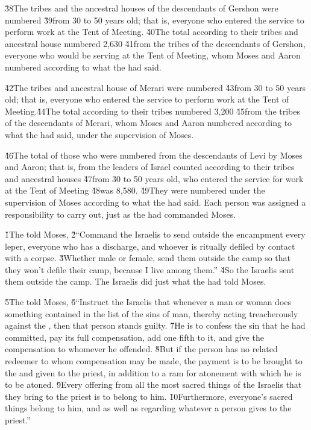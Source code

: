 \v{38}The tribes and the ancestral houses of the descendants of Gershon were numbered \v{39}from 30 to 50 years old; that is, everyone who entered the service to perform work at the Tent of Meeting. \v{40}The total according to their tribes and ancestral house numbered 2,630 \v{41}from the tribes of the descendants of Gershon, everyone who would be serving at the Tent of Meeting, whom Moses and Aaron numbered according to what the  had said.

\v{42}The tribes and ancestral house of Merari were numbered \v{43}from 30 to 50 years old; that is, everyone who entered the service to perform work at the Tent of Meeting.\v{44}The total according to their tribes numbered 3,200 \v{45}from the tribes of the descendants of Merari, whom Moses and Aaron numbered according to what the  had said, under the supervision of Moses.

\v{46}The total of those who were numbered from the descendants of Levi by Moses and Aaron; that is, from the leaders of Israel counted according to their tribes and ancestral houses \v{47}from 30 to 50 years old, who entered the service for work at the Tent of Meeting \v{48}was 8,580. \v{49}They were numbered under the supervision of Moses according to what the  had said. Each person was assigned a responsibility to carry out, just as the  had commanded Moses.

\v{1}The  told Moses, \v{2}``Command the Israelis to send outside the encampment every leper, everyone who has a discharge, and whoever is ritually defiled by contact with a corpse. \v{3}Whether male or female, send them outside the camp so that they won't defile their camp, because I live among them.'' \v{4}So the Israelis sent them outside the camp. The Israelis did just what the  had told Moses.

\v{5}The  told Moses, \v{6}``Instruct the Israelis that whenever a man or woman does something contained in the list of the sins of man, thereby acting treacherously against the , then that person stands guilty. \v{7}He is to confess the sin that he had committed, pay its full compensation, add one fifth to it, and give the compensation to whomever he offended. \v{8}But if the person has no related redeemer to whom compensation may be made, the payment is to be brought to the  and given to the priest, in addition to a ram for atonement with which he is to be atoned. \v{9}Every offering from all the most sacred things of the Israelis that they bring to the priest is to belong to him. \v{10}Furthermore, everyone's sacred things belong to him, and as well as regarding whatever a person gives to the priest.''

